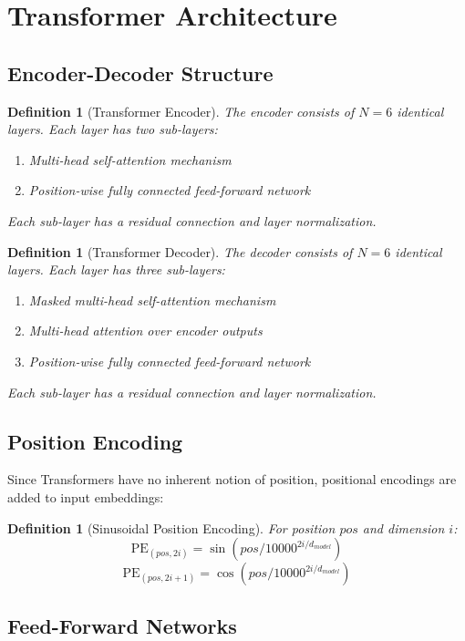 \documentclass[11pt,a4paper]{article}
\newtheorem{definition}[theorem]{Definition}
\begin{document}
\section{Transformer Architecture}

\subsection{Encoder-Decoder Structure}

\begin{definition}[Transformer Encoder]
The encoder consists of $N = 6$ identical layers. Each layer has two sub-layers:
\begin{enumerate}
\item Multi-head self-attention mechanism
\item Position-wise fully connected feed-forward network
\end{enumerate}
Each sub-layer has a residual connection and layer normalization.
\end{definition}

\begin{definition}[Transformer Decoder]
The decoder consists of $N = 6$ identical layers. Each layer has three sub-layers:
\begin{enumerate}
\item Masked multi-head self-attention mechanism
\item Multi-head attention over encoder outputs
\item Position-wise fully connected feed-forward network
\end{enumerate}
Each sub-layer has a residual connection and layer normalization.
\end{definition}

\subsection{Position Encoding}

Since Transformers have no inherent notion of position, positional encodings are added to input embeddings:

\begin{definition}[Sinusoidal Position Encoding]
For position $pos$ and dimension $i$:
$$\text{PE}_{(pos,2i)} = \sin(pos / 10000^{2i/d_{model}})$$
$$\text{PE}_{(pos,2i+1)} = \cos(pos / 10000^{2i/d_{model}})$$
\end{definition}

\subsection{Feed-Forward Networks}
\end{document}
